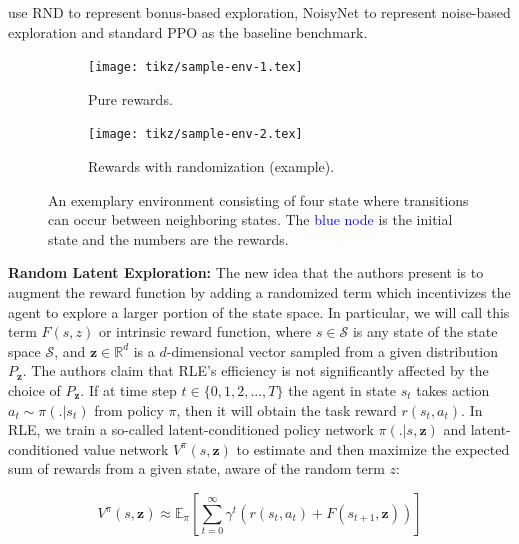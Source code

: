 \documentclass[10pt]{article} %
\begin{document}
\noindent \cite{rle-paper} use RND to represent bonus-based exploration, NoisyNet to represent noise-based exploration and standard PPO as the baseline benchmark.

\begin{figure}[h!]
  \centering
  \begin{subfigure}[b]{0.45\textwidth}
    \centering
    \texttt{[image: tikz/sample-env-1.tex]}
    \caption{Pure rewards.}
    \label{fig:sample-env-1}
  \end{subfigure}
  \hfill
  \begin{subfigure}[b]{0.45\textwidth}
    \centering
    \texttt{[image: tikz/sample-env-2.tex]}
    \caption{Rewards with randomization (example).}
    \label{fig:sample-env-2}
  \end{subfigure}
  
  \caption{An exemplary environment consisting of four state where transitions can occur between neighboring states. The \textcolor{blue}{blue node} is the initial state and the numbers are the rewards.}
  \label{fig:sample-env}
\end{figure}

\newpage
\noindent \textbf{Random Latent Exploration:} The new idea that the authors \cite{rle-paper} present is to augment the reward function by adding a randomized term which incentivizes the agent to explore a larger portion of the state space. In particular, we will call this term $F(s, z)$ or intrinsic reward function, where $s \in \mathcal{S}$ is any state of the state space $\mathcal{S}$, and $\textbf{z} \in \mathbb{R}^{d}$ is a $d$-dimensional vector sampled from a given distribution $P_{\textbf{z}}$. The authors \cite{rle-paper} claim that RLE's efficiency is not significantly affected by the choice of $P_{\textbf{z}}$. If at time step $t \in \{0, 1, 2, ..., T\}$ the agent in state $s_{t}$ takes action $a_{t} \sim \pi(. | s_{t})$ from policy $\pi$, then it will obtain the task reward $r (s_{t}, a_{t})$. In RLE, we train a so-called latent-conditioned policy network $\pi(. | s, \textbf{z})$ and latent-conditioned value network $V^{\pi}(s, \textbf{z})$ to estimate and then maximize the expected sum of rewards from a given state, aware of the random term $z$:

\begin{equation}
    V^{\pi}(s, \textbf{z}) \approx \mathbb{E}_{\pi} \left[\sum_{t = 0}^{\infty} \gamma^{t} \left(r(s_{t}, a_{t}) + F(s_{t+1}, \textbf{z})\right) \right]
    \label{eq:value_func}
\end{equation}
\end{document}
